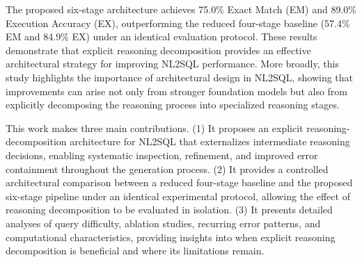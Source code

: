 \documentclass{svproc}
\begin{document}
The proposed six-stage architecture achieves 75.0\% Exact Match (EM) and 89.0\% Execution Accuracy (EX), outperforming the reduced four-stage baseline (57.4\% EM and 84.9\% EX) under an identical evaluation protocol. These results demonstrate that explicit reasoning decomposition provides an effective architectural strategy for improving NL2SQL performance. More broadly, this study highlights the importance of architectural design in NL2SQL, showing that improvements can arise not only from stronger foundation models but also from explicitly decomposing the reasoning process into specialized reasoning stages.



This work makes three main contributions. (1) It proposes an explicit reasoning-decomposition architecture for NL2SQL that externalizes intermediate reasoning decisions, enabling systematic inspection, refinement, and improved error containment throughout the generation process. (2) It provides a controlled architectural comparison between a reduced four-stage baseline and the proposed six-stage pipeline under an identical experimental protocol, allowing the effect of reasoning decomposition to be evaluated in isolation. (3) It presents detailed analyses of query difficulty, ablation studies, recurring error patterns, and computational characteristics, providing insights into when explicit reasoning decomposition is beneficial and where its limitations remain.

\end{document}

